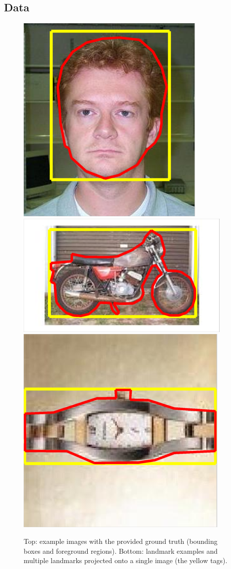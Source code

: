 \documentclass[review]{elsarticle}
\begin{document}
\subsection{Data\label{sec:data}}
%
%
\begin{figure}[h]
\begin{center}
  \includegraphics[width=0.2\linewidth]{resources/caltech-101_face_example.png}
  \includegraphics[width=0.3\linewidth]{resources/caltech-101_motorbikes_example.png}
  \includegraphics[width=0.2\linewidth]{resources/caltech-101_watch_example.png}\\
  \caption{Top: example images with the provided ground truth (bounding boxes and foreground regions).
    Bottom: landmark examples and multiple landmarks projected onto
    a single image (the yellow tags).
    \label{fig:caltech}}
  \end{center}
\end{figure}
\end{document}
